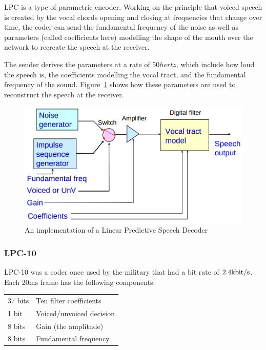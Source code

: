 
LPC is a type of parametric encoder. Working on the principle that voiced speech
is created by the vocal chords opening and closing at frequencies that change
over time, the coder can send the fundamental frequency of the noise as well as
parameters (called coefficients here) modelling the shape of the mouth over the
network to recreate the speech at the receiver.

The sender derives the parameters at a rate of $50\si{hertz}$, which include how
loud the speech is, the coefficients modelling the vocal tract, and the
fundamental frequency of the sound. Figure~\ref{LPC} shows how these parameters
are used to reconstruct the speech at the receiver.

\begin{figure}
  \centering
  \includegraphics[width=\textwidth]{images/LPC}
  \caption{An implementation of a Linear Predictive Speech Decoder}
  \label{LPC}
\end{figure}

\subsubsection{LPC-10}

LPC-10 was a coder once used by the military that had a bit rate of
$2.4\si{\kilo\bit\per\second}$. Each $20\si{\milli\second}$ frame has the
following components:

\begin{tabular}{l l}
  37 bits & Ten filter coefficients\\
  1 bit & Voiced/unvoiced decision\\
  8 bits & Gain (the amplitude)\\
  8 bits & Fundamental frequency\\
\end{tabular}

